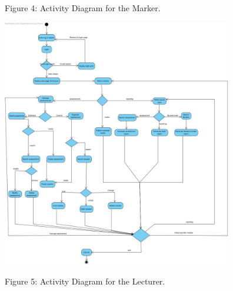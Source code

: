 \documentclass[a4paper]{article}
\begin{document}
\begin{center}
Figure 4: Activity Diagram for the Marker.
\end{center}
\includegraphics[width=380px]{Images/WEBUWLecturerActivity.jpg}
\begin{center}
Figure 5: Activity Diagram for the Lecturer.
\end{center}
\end{document}

